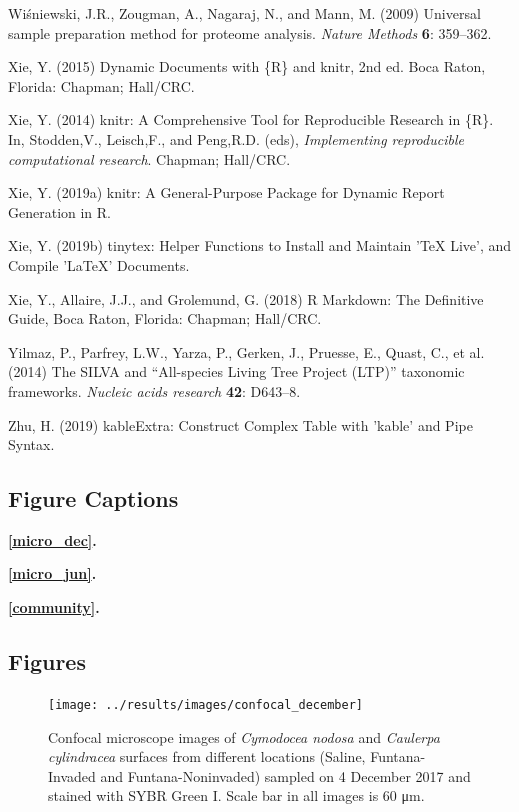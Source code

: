 \documentclass[12pt,]{article}
\begin{document}
\hypertarget{ref-Wisniewski2009}{}
Wiśniewski, J.R., Zougman, A., Nagaraj, N., and Mann, M. (2009)
Universal sample preparation method for proteome analysis. \emph{Nature
Methods} \textbf{6}: 359--362.

\hypertarget{ref-Xie2015}{}
Xie, Y. (2015) Dynamic Documents with \{R\} and knitr, 2nd ed. Boca
Raton, Florida: Chapman; Hall/CRC.

\hypertarget{ref-Xie2014}{}
Xie, Y. (2014) knitr: A Comprehensive Tool for Reproducible Research in
\{R\}. In, Stodden,V., Leisch,F., and Peng,R.D. (eds),
\emph{Implementing reproducible computational research}. Chapman;
Hall/CRC.

\hypertarget{ref-Xie2019a}{}
Xie, Y. (2019a) knitr: A General-Purpose Package for Dynamic Report
Generation in R.

\hypertarget{ref-Xie2019}{}
Xie, Y. (2019b) tinytex: Helper Functions to Install and Maintain 'TeX
Live', and Compile 'LaTeX' Documents.

\hypertarget{ref-Xie2018}{}
Xie, Y., Allaire, J.J., and Grolemund, G. (2018) R Markdown: The
Definitive Guide, Boca Raton, Florida: Chapman; Hall/CRC.

\hypertarget{ref-Yilmaz2014}{}
Yilmaz, P., Parfrey, L.W., Yarza, P., Gerken, J., Pruesse, E., Quast,
C., et al. (2014) The SILVA and ``All-species Living Tree Project
(LTP)'' taxonomic frameworks. \emph{Nucleic acids research} \textbf{42}:
D643--8.

\hypertarget{ref-Zhu2019}{}
Zhu, H. (2019) kableExtra: Construct Complex Table with 'kable' and Pipe
Syntax.

\newpage 

\setlength\parindent{0pt}

\subsection{Figure Captions}\label{figure-captions}

\textbf{\autoref{micro_dec}.} 

\textbf{\autoref{micro_jun}.} 

\textbf{\autoref{community}.} 

\newpage

\subsection{Figures}\label{figures}

\begin{figure}[ht]

{\centering \texttt{[image: ../results/images/confocal\_december]} 

}

\caption{Confocal microscope images of \textit{Cymodocea nodosa} and \textit{Caulerpa cylindracea} surfaces from different locations (Saline, Funtana-Invaded and Funtana-Noninvaded) sampled on 4 December 2017 and stained with SYBR Green I. Scale bar in all images is 60 \si{\um}.\label{micro_dec}}\label{fig:unnamed-chunk-2}
\end{figure}\newpage
\end{document}
